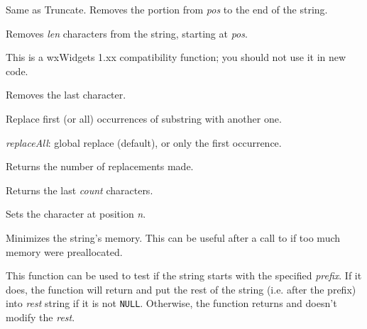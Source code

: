 Same as Truncate. Removes the portion from {\it pos} to the end of the string.


Removes {\it len} characters from the string, starting at {\it pos}.

This is a wxWidgets 1.xx compatibility function; you should not use it in new code.


\label{wxstringremovelast}


Removes the last character.


\label{wxstringreplace}


Replace first (or all) occurrences of substring with another one.

{\it replaceAll}: global replace (default), or only the first occurrence.

Returns the number of replacements made.


\label{wxstringright}


Returns the last {\it count} characters.


\label{wxstringsetchar}


Sets the character at position {\it n}.


\label{wxstringshrink}


Minimizes the string's memory. This can be useful after a call to 
 if too much memory were preallocated.


\label{wxstringstartswith}


This function can be used to test if the string starts with the specified 
{\it prefix}. If it does, the function will return \true and put the rest
of the string (i.e. after the prefix) into {\it rest} string if it is not 
{\tt NULL}. Otherwise, the function returns \false and doesn't modify the
{\it rest}.


